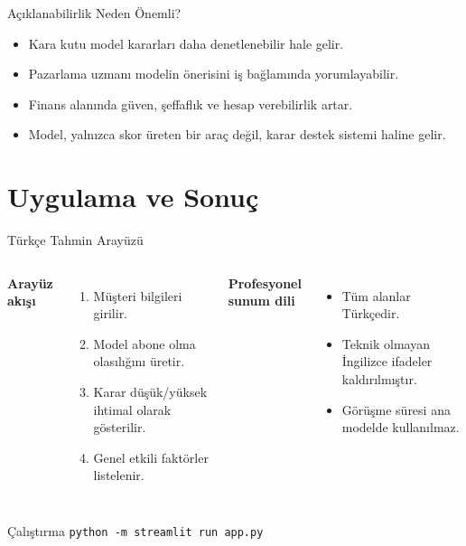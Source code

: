 \documentclass[aspectratio=169]{beamer}
\begin{document}
\begin{frame}{Açıklanabilirlik Neden Önemli?}
    \begin{itemize}
        \item Kara kutu model kararları daha denetlenebilir hale gelir.
        \item Pazarlama uzmanı modelin önerisini iş bağlamında yorumlayabilir.
        \item Finans alanında güven, şeffaflık ve hesap verebilirlik artar.
        \item Model, yalnızca skor üreten bir araç değil, karar destek sistemi haline gelir.
    \end{itemize}
\end{frame}

\section{Uygulama ve Sonuç}

\begin{frame}{Türkçe Tahmin Arayüzü}
    \begin{columns}[T]
        \textbf{Arayüz akışı}
        \begin{enumerate}
            \item Müşteri bilgileri girilir.
            \item Model abone olma olasılığını üretir.
            \item Karar düşük/yüksek ihtimal olarak gösterilir.
            \item Genel etkili faktörler listelenir.
        \end{enumerate}

        \textbf{Profesyonel sunum dili}
        \begin{itemize}
            \item Tüm alanlar Türkçedir.
            \item Teknik olmayan İngilizce ifadeler kaldırılmıştır.
            \item Görüşme süresi ana modelde kullanılmaz.
        \end{itemize}
    \end{columns}

    \vspace{0.25cm}
    \begin{block}{Çalıştırma}
        \texttt{python -m streamlit run app.py}
    \end{block}
\end{frame}
\end{document}
